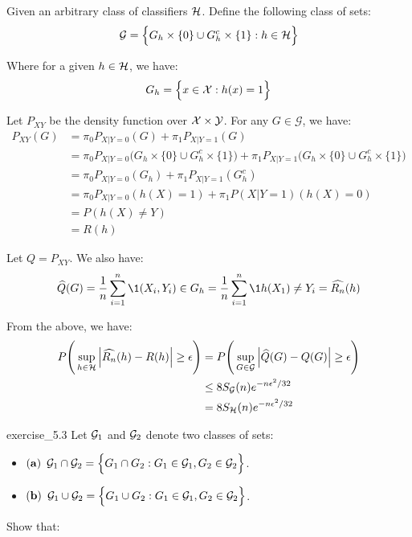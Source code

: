 \begin{solution*}
    Given an arbitrary class of classifiers $\mathcal{H}$. Define the following class of sets:
    \begin{align*}
        \mathcal{G} = \Big\{ 
            G_h \times \{0\} \cup G_h^c \times \{1\} : h \in \mathcal{H}
         \Big\}
    \end{align*}

    \noindent Where for a given $h\in\mathcal{H}$, we have:
    \begin{align*}
        G_h = \Big\{ 
            x \in \mathcal{X} : h(x) = 1
         \Big\}
    \end{align*}

    \noindent Let $P_{XY}$ be the density function over $\mathcal{X}\times\mathcal{Y}$. For any $G\in\mathcal{G}$, we have:
    \begin{align*}
        P_{XY}(G) &= \pi_0P_{X|Y=0}(G) + \pi_1P_{X|Y=1}(G) \\
            &= \pi_0P_{X|Y=0}\Big(G_h \times \{0\} \cup G_h^c \times \{1\}\Big)
                + \pi_1P_{X|Y=1}\Big(G_h \times \{0\} \cup G_h^c \times \{1\}\Big) \\
            &= \pi_0P_{X|Y=0}(G_h) + \pi_1P_{X|Y=1}(G_h^c) \\
            &= \pi_0P_{X|Y=0}(h(X)=1) + \pi_1P(X|Y=1)(h(X)=0) \\
            &= P(h(X) \ne Y) \\
            &= R(h)
    \end{align*}

    \noindent Let $Q=P_{XY}$. We also have:
    \begin{align*}
        \widehat{Q}(G) = \frac{1}{n}\sum_{i=1}^n \1{(X_i, Y_i) \in G_h} = \frac{1}{n}\sum_{i=1}^n \1{h(X_1)\ne Y_i} = \widehat{R_n}(h)
    \end{align*}


    \noindent From the above, we have:
    \begin{align*}
        P\Bigg( 
            \sup_{h\in\mathcal{H}} \Big|  \widehat{R_n}(h) - R(h)  \Big| \ge \epsilon
         \Bigg)
        &= P\Bigg( 
            \sup_{G\in\mathcal{G}} \Big|  \widehat{Q}(G) - Q(G)  \Big| \ge \epsilon
         \Bigg) \\
        &\le 8S_\mathcal{G}(n)e^{-n\epsilon^2/32} \\
        &=   8S_\mathcal{H}(n)e^{-n\epsilon^2/32} \\
    \end{align*}
\end{solution*}

\begin{exercise}{}{exercise_5.3}
    Let $\mathcal{G}_1$ and $\mathcal{G}_2$ denote two classes of sets:
    \begin{itemize}
        \item ${\bf (a)}$ $\mathcal{G}_1 \cap \mathcal{G}_2=\Big\{ G_1\cap G_2: G_1\in\mathcal{G}_1, G_2 \in\mathcal{G}_2 \Big\}$.
        \item ${\bf (b)}$ $\mathcal{G}_1 \cup \mathcal{G}_2=\Big\{ G_1\cup G_2: G_1\in\mathcal{G}_1, G_2 \in\mathcal{G}_2 \Big\}$.
    \end{itemize}

    Show that:
\end{exercise}

